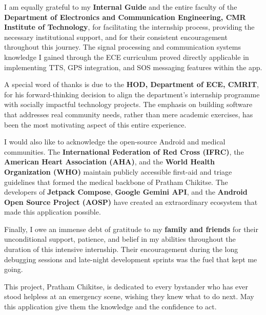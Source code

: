 \documentclass[12pt,a4paper]{report}
\begin{document}
\vspace{0.4cm}

I am equally grateful to my \textbf{Internal Guide} and the entire faculty of the \textbf{Department of Electronics and Communication Engineering, CMR Institute of Technology}, for facilitating the internship process, providing the necessary institutional support, and for their consistent encouragement throughout this journey. The signal processing and communication systems knowledge I gained through the ECE curriculum proved directly applicable in implementing TTS, GPS integration, and SOS messaging features within the app.

\vspace{0.4cm}

A special word of thanks is due to the \textbf{HOD, Department of ECE, CMRIT}, for his forward-thinking decision to align the department's internship programme with socially impactful technology projects. The emphasis on building software that addresses real community needs, rather than mere academic exercises, has been the most motivating aspect of this entire experience.

\vspace{0.4cm}

I would also like to acknowledge the open-source Android and medical communities. The \textbf{International Federation of Red Cross (IFRC)}, the \textbf{American Heart Association (AHA)}, and the \textbf{World Health Organization (WHO)} maintain publicly accessible first-aid and triage guidelines that formed the medical backbone of Pratham Chikitse. The developers of \textbf{Jetpack Compose}, \textbf{Google Gemini API}, and the \textbf{Android Open Source Project (AOSP)} have created an extraordinary ecosystem that made this application possible.

\vspace{0.4cm}

Finally, I owe an immense debt of gratitude to my \textbf{family and friends} for their unconditional support, patience, and belief in my abilities throughout the duration of this intensive internship. Their encouragement during the long debugging sessions and late-night development sprints was the fuel that kept me going.

\vspace{0.5cm}

\noindent This project, Pratham Chikitse, is dedicated to every bystander who has ever stood helpless at an emergency scene, wishing they knew what to do next. May this application give them the knowledge and the confidence to act.
\end{document}
